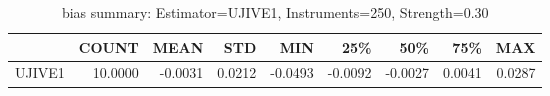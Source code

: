 \begin{table}[ht]
\centering
\caption{bias summary: Estimator=UJIVE1, Instruments=250, Strength=0.30}
\begin{tabular}{lrrrrrrrr}
\toprule
 & COUNT & MEAN & STD & MIN & 25\% & 50\% & 75\% & MAX \\
\midrule
UJIVE1 & 10.0000 & -0.0031 & 0.0212 & -0.0493 & -0.0092 & -0.0027 & 0.0041 & 0.0287 \\
\bottomrule
\end{tabular}
\end{table}
